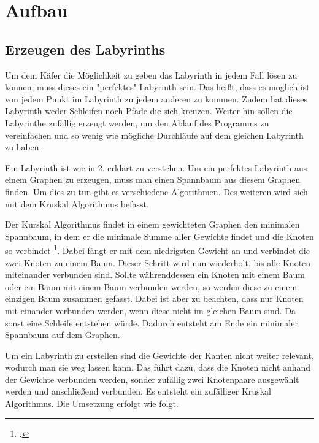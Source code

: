 \documentclass[12pt, a4paper, titlepage]{article}
\begin{document}
\newpage

\section{Aufbau}

\subsection{Erzeugen des Labyrinths}

Um dem Käfer die Möglichkeit zu geben das Labyrinth in jedem Fall lösen zu können, muss dieses ein "perfektes" Labyrinth sein.
Das heißt, dass es möglich ist von jedem Punkt im Labyrinth zu jedem anderen zu kommen.
Zudem hat dieses Labyrinth weder Schleifen noch Pfade die sich kreuzen.
Weiter hin sollen die Labyrinthe zufällig erzeugt werden, um den Ablauf des Programms zu vereinfachen und so wenig wie mögliche Durchläufe auf dem gleichen Labyrinth zu haben.

\bigskip

Ein Labyrinth ist wie in 2. erklärt zu verstehen.
Um ein perfektes Labyrinth aus einem Graphen zu erzeugen, muss man einen Spannbaum aus diesem Graphen finden.
Um dies zu tun gibt es verschiedene Algorithmen.
Des weiteren wird sich mit dem Kruskal Algorithmus befasst.


\bigskip

Der Kurskal Algorithmus findet in einem gewichteten Graphen den minimalen Spannbaum, in dem er die minimale Summe aller Gewichte findet und die Knoten so verbindet \footcite{maze}.
Dabei fängt er mit dem niedrigsten Gewicht an und verbindet die zwei Knoten zu einem Baum.
Dieser Schritt wird nun wiederholt, bis alle Knoten miteinander verbunden sind.
Sollte währenddessen ein Knoten mit einem Baum oder ein Baum mit einem Baum verbunden werden, so werden diese zu einem einzigen Baum zusammen gefasst.
Dabei ist aber zu beachten, dass nur Knoten mit einander verbunden werden, wenn diese nicht im gleichen Baum sind.
Da sonst eine Schleife entstehen würde.
Dadurch entsteht am Ende ein minimaler Spannbaum auf dem Graphen.
 

\bigskip

Um ein Labyrinth zu erstellen sind die Gewichte der Kanten nicht weiter relevant, wodurch man sie weg lassen kann.
Das führt dazu, dass die Knoten nicht anhand der Gewichte verbunden werden, sonder zufällig zwei Knotenpaare ausgewählt werden und anschließend verbunden.
Es entsteht ein zufälliger Kruskal Algorithmus.
Die Umsetzung erfolgt wie folgt.
\end{document}
